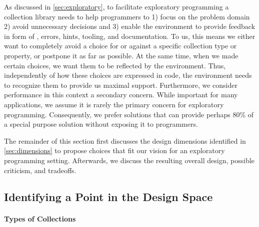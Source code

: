 \documentclass[sigconf, authorversion]{acmart}
\begin{document}

As discussed in \cref{sec:exploratory}, to facilitate exploratory programming
a collection library needs to help programmers to
1) focus on the problem domain
2) avoid unnecessary decisions
and 3) enable the environment to provide feedback in form of
\eg, errors, hints, tooling, and documentation.
To us, this means we either want to completely avoid a choice
for or against a specific collection type or property,
or postpone it as far as possible.
At the same time, when we made certain choices,
we want them to be reflected by the environment.
Thus, independently of how these choices are expressed in code,
the environment needs to recognize them to provide us maximal support.
Furthermore, we consider performance in this context a secondary concern.
While important for many applications,
we assume it is rarely the primary concern for exploratory programming.
Consequently, we prefer solutions that can provide perhaps 80\%
of a special purpose solution without exposing it to programmers. 

The remainder of this section first discusses the design dimensions
identified in \cref{sec:dimensions}
to propose choices that fit our vision for an exploratory programming setting.
Afterwards, we discuss the resulting overall design,
possible criticism, and tradeoffs. 

\subsection{Identifying a Point in the Design Space}

\paragraph{Types of Collections}
\end{document}
